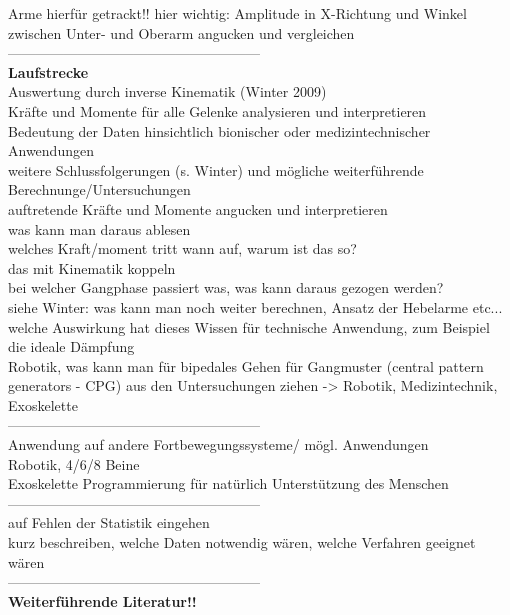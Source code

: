 Arme hierfür getrackt!! hier wichtig: Amplitude in X-Richtung und Winkel zwischen Unter- und Oberarm angucken und vergleichen\\
------------------------------------------------------\\
\textbf{Laufstrecke}\\
Auswertung durch inverse Kinematik (Winter 2009)\\
Kräfte und Momente für alle Gelenke analysieren und interpretieren\\
Bedeutung der Daten hinsichtlich bionischer oder medizintechnischer Anwendungen\\
weitere Schlussfolgerungen (s. Winter) und mögliche weiterführende Berechnunge/Untersuchungen\\

auftretende Kräfte und Momente angucken und interpretieren\\
was kann man daraus ablesen\\
welches Kraft/moment tritt wann auf, warum ist das so?\\
das mit Kinematik koppeln\\
bei welcher Gangphase passiert was, was kann daraus gezogen werden?\\
siehe Winter: was kann man noch weiter berechnen, Ansatz der Hebelarme etc...\\
welche Auswirkung hat dieses Wissen für technische Anwendung, zum Beispiel die ideale Dämpfung\\
Robotik, was kann man für bipedales Gehen für Gangmuster (central pattern generators - CPG) aus den Untersuchungen ziehen -> Robotik, Medizintechnik, Exoskelette\\



------------------------------------------------------\\
Anwendung auf andere Fortbewegungssysteme/ mögl. Anwendungen\\
Robotik, 4/6/8 Beine\\
Exoskelette Programmierung für natürlich Unterstützung des Menschen\\
------------------------------------------------------\\
auf Fehlen der Statistik eingehen\\
kurz beschreiben, welche Daten notwendig wären, welche Verfahren geeignet wären\\
------------------------------------------------------\\
\textbf{Weiterführende Literatur!!}\\
\clearpage

